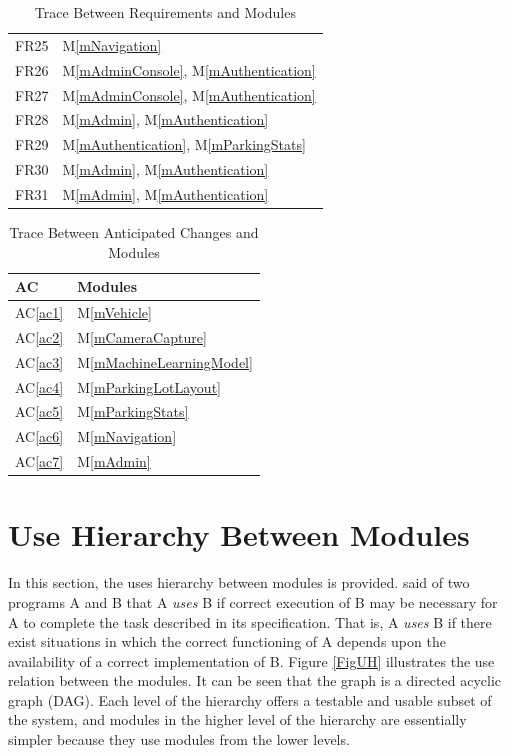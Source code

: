 \documentclass[12pt, titlepage]{article}
\newcommand{\acref}[1]{AC\ref{#1}}
\newcommand{\mref}[1]{M\ref{#1}}
\begin{document}
\begin{table}[H]
\begin{tabular}{p{} p{}}
FR25 & \mref{mNavigation}\\
FR26 & \mref{mAdminConsole}, \mref{mAuthentication}\\
FR27 & \mref{mAdminConsole}, \mref{mAuthentication}\\
FR28 & \mref{mAdmin}, \mref{mAuthentication}\\
FR29 & \mref{mAuthentication}, \mref{mParkingStats}\\
FR30 & \mref{mAdmin}, \mref{mAuthentication}\\
FR31 & \mref{mAdmin}, \mref{mAuthentication}\\
\bottomrule
\end{tabular}
\caption{Trace Between Requirements and Modules}
\label{TblRT}
\end{table}

\begin{table}[H]
\centering
\begin{tabular}{p{} p{}}
\toprule
\textbf{AC} & \textbf{Modules}\\
\midrule
\acref{ac1} & \mref{mVehicle}\\
\acref{ac2} & \mref{mCameraCapture}\\
\acref{ac3} & \mref{mMachineLearningModel}\\
\acref{ac4} & \mref{mParkingLotLayout}\\
\acref{ac5} & \mref{mParkingStats}\\
\acref{ac6} & \mref{mNavigation}\\
\acref{ac7} & \mref{mAdmin}\\
\bottomrule
\end{tabular}
\caption{Trace Between Anticipated Changes and Modules}
\label{TblACT}
\end{table}

\section{Use Hierarchy Between Modules} \label{SecUse}

In this section, the uses hierarchy between modules is provided.
\cite{Parnas1978} said of two programs A and B that A {\em uses} B if correct
execution of B may be necessary for A to complete the task described in its
specification. That is, A {\em uses} B if there exist situations in which the
correct functioning of A depends upon the availability of a correct
implementation of B.  Figure \ref{FigUH} illustrates the use relation between
the modules. It can be seen that the graph is a directed acyclic graph (DAG).
Each level of the hierarchy offers a testable and usable subset of the system,
and modules in the higher level of the hierarchy are essentially simpler because
they use modules from the lower levels.
\end{document}
